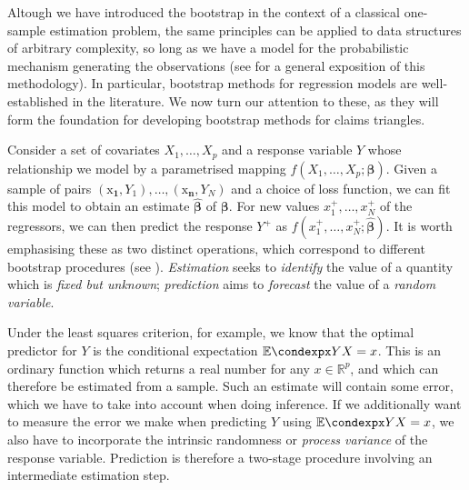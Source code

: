 \documentclass[a4paper]{book}
\begin{document}
Altough we have introduced the bootstrap in the context of a classical one-sample estimation problem, the same principles can be applied to data structures of arbitrary complexity, so long as we have a model for the probabilistic mechanism generating the observations (see \cite[Chapter 8]{efron:intro} for a general exposition of this methodology). In particular, bootstrap methods for regression models are well-established in the literature. We now turn our attention to these, as they will form the foundation for developing bootstrap methods for claims triangles.

Consider a set of covariates $X_1, \dots, X_p$ and a response variable $Y$ whose relationship we model by a parametrised mapping $f(X_1, \dots, X_p; \bm{\beta})$. Given a sample of pairs $(\bm{\mathrm{x}_1}, Y_1), \dots, (\bm{\mathrm{x}_n}, Y_N)$ and a choice of loss function, we can fit this model to obtain an estimate $\widehat{\bm{\beta}}$ of $\bm{\beta}$. For new values $x_1^+, \dots, x_N^+$ of the regressors, we can then predict the response $Y^+$ as $f(x_1^+, \dots, x_N^+; \widehat{\bm{\beta}})$. It is worth emphasising these as two distinct operations, which correspond to different bootstrap procedures (see \cite[Sections 6.3.3 and 7.2.4]{davison}). \emph{Estimation} seeks to \emph{identify} the value of a quantity which is \emph{fixed but unknown}; \emph{prediction} aims to \emph{forecast} the value of a \emph{random variable}. 

Under the least squares criterion, for example, we know that the optimal predictor for $Y$ is the conditional expectation $\condexp{Y}{X = x}$. This is an ordinary function which returns a real number for any $x \in \mathbb{R}^p$, and which can therefore be estimated from a sample. Such an estimate will contain some error, which we have to take into account when doing inference. If we additionally want to measure the error we make when predicting $Y$ using $\condexp{Y}{X = x}$, we also have to incorporate the intrinsic randomness or \emph{process variance} of the response variable. Prediction is therefore a two-stage procedure involving an intermediate estimation step.
\end{document}
